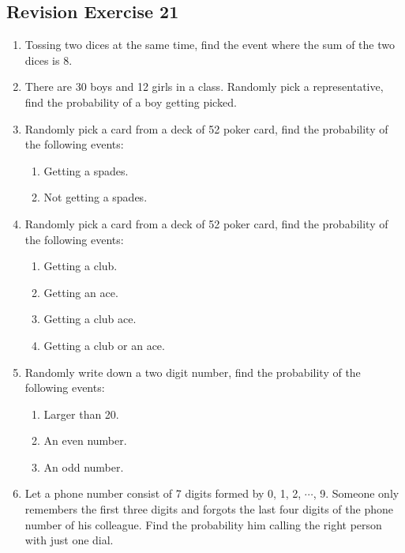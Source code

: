\documentclass{report}
\begin{document}
\begin{multicols}{2}
  \section{Revision Exercise 21}

  \begin{enumerate}
    \item Tossing two dices at the same time, find the event where the sum of the two
          dices is $8$.

    \item There are 30 boys and 12 girls in a class. Randomly pick a representative, find
          the probability of a boy getting picked.

    \item Randomly pick a card from a deck of 52 poker card, find the probability of the
          following events:
          \begin{enumerate}
            \item Getting a spades.
            \item Not getting a spades.
          \end{enumerate}

    \item Randomly pick a card from a deck of 52 poker card, find the probability of the
          following events:
          \begin{enumerate}
            \item Getting a club.
            \item Getting an ace.
            \item Getting a club ace.
            \item Getting a club or an ace.
          \end{enumerate}

    \item Randomly write down a two digit number, find the probability of the following
          events:
          \begin{enumerate}
            \item Larger than 20.
            \item An even number.
            \item An odd number.
          \end{enumerate}

    \item Let a phone number consist of 7 digits formed by 0, 1, 2, $\cdots$, 9. Someone
          only remembers the first three digits and forgots the last four digits of the
          phone number of his colleague. Find the probability him calling the right
          person with just one dial.


\end{enumerate}
\end{multicols}
\end{document}
